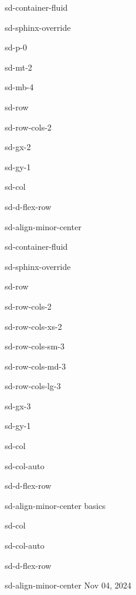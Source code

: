 \documentclass[letterpaper,10pt,english]{jupyterBook}
\begin{document}
\sphinxstepscope

\begin{sphinxuseclass}{sd-container-fluid}
\begin{sphinxuseclass}{sd-sphinx-override}
\begin{sphinxuseclass}{sd-p-0}
\begin{sphinxuseclass}{sd-mt-2}
\begin{sphinxuseclass}{sd-mb-4}
\begin{sphinxuseclass}{sd-row}
\begin{sphinxuseclass}{sd-row-cols-2}
\begin{sphinxuseclass}{sd-gx-2}
\begin{sphinxuseclass}{sd-gy-1}
\begin{sphinxuseclass}{sd-col}
\begin{sphinxuseclass}{sd-d-flex-row}
\begin{sphinxuseclass}{sd-align-minor-center}
\begin{sphinxuseclass}{sd-container-fluid}
\begin{sphinxuseclass}{sd-sphinx-override}
\begin{sphinxuseclass}{sd-row}
\begin{sphinxuseclass}{sd-row-cols-2}
\begin{sphinxuseclass}{sd-row-cols-xs-2}
\begin{sphinxuseclass}{sd-row-cols-sm-3}
\begin{sphinxuseclass}{sd-row-cols-md-3}
\begin{sphinxuseclass}{sd-row-cols-lg-3}
\begin{sphinxuseclass}{sd-gx-3}
\begin{sphinxuseclass}{sd-gy-1}
\begin{sphinxuseclass}{sd-col}
\begin{sphinxuseclass}{sd-col-auto}
\begin{sphinxuseclass}{sd-d-flex-row}
\begin{sphinxuseclass}{sd-align-minor-center}
\sphinxAtStartPar
basics

\end{sphinxuseclass}
\end{sphinxuseclass}
\end{sphinxuseclass}
\end{sphinxuseclass}
\begin{sphinxuseclass}{sd-col}
\begin{sphinxuseclass}{sd-col-auto}
\begin{sphinxuseclass}{sd-d-flex-row}
\begin{sphinxuseclass}{sd-align-minor-center}
\sphinxAtStartPar
Nov 04, 2024


\end{sphinxuseclass}
\end{sphinxuseclass}
\end{sphinxuseclass}
\end{sphinxuseclass}
\end{sphinxuseclass}
\end{sphinxuseclass}
\end{sphinxuseclass}
\end{sphinxuseclass}
\end{sphinxuseclass}
\end{sphinxuseclass}
\end{sphinxuseclass}
\end{sphinxuseclass}
\end{sphinxuseclass}
\end{sphinxuseclass}
\end{sphinxuseclass}
\end{sphinxuseclass}
\end{sphinxuseclass}
\end{sphinxuseclass}
\end{sphinxuseclass}
\end{sphinxuseclass}
\end{sphinxuseclass}
\end{sphinxuseclass}
\end{sphinxuseclass}
\end{sphinxuseclass}
\end{sphinxuseclass}
\end{sphinxuseclass}
\end{document}
